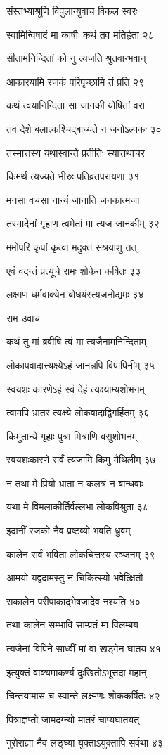 संस्तभ्याश्रूणि विपुलान्युवाच विकल स्वरः

स्वामिन्विषादं मा कार्षीः कथं तव मतिर्हृता २८

सीतामनिन्दितां को नु त्यजति श्रुतवान्भवान्

आकारयामि रजकं परिपृच्छामि तं प्रति २९

कथं त्वयानिन्दिता सा जानकी योषितां वरा

तव देशे बलात्कश्चिद्बाध्यते न जनोऽल्पकः ३०

तस्मात्तस्य यथास्वान्ते प्रतीतिः स्यात्तथाचर

किमर्थं त्यज्यते भीरुः पतिव्रतपरायणा ३१

मनसा वचसा नान्यं जानाति जनकात्मजा

तस्मादेनां गृहाण त्वमेतां मा त्यज जानकीम् ३२

ममोपरि कृपां कृत्वा मदुक्तं संश्रयाशु तत्

एवं वदन्तं प्रत्यूचे रामः शोकेन कर्षितः ३३

लक्ष्मणं धर्मवाक्येन बोधयंस्त्यजनोद्यमः ३४

राम उवाच

कथं तु मां ब्रवीषि त्वं मा त्यजैनामनिन्दिताम्

लोकापवादात्त्यक्ष्येऽहं जानन्नपि विपापिनीम् ३५

स्वयशः कारणेऽहं स्वं देहं त्यक्ष्याम्यशोभनम्

त्वामपि भ्रातरं त्यक्ष्ये लोकवादाद्विगर्हितम् ३६

किमुतान्ये गृहाः पुत्रा मित्राणि वसुशोभनम्

स्वयशःकारणे सर्वं त्यजामि किमु मैथिलीम् ३७

न तथा मे प्रियो भ्राता न कलत्रं न बान्धवाः

यथा मे विमलाकीर्तिर्वल्लभा लोकविश्रुता ३८

इदानीं रजको नैव प्रष्टव्यो भवति ध्रुवम्

कालेन सर्वं भविता लोकचित्तस्य रञ्जनम् ३९

आमयो यद्वदामस्तु न चिकित्स्यो भवेत्क्षितौ

सकालेन परीपाकाद्भेषजादेव नश्यति ४०

तथा कालेन सम्भावि साम्प्रतं मा विलम्बय

त्यजैनां विपिने साध्वीं मां वा खड्गेन घातय ४१

इत्युक्तं वाक्यमाकर्ण्य दुःखितोऽभूत्तदा महान्

चिन्तयामास च स्वान्ते लक्ष्मणः शोककर्षितः ४२

पित्राज्ञप्तो जामदग्न्यो मातरं चाप्यघातयत्

गुरोराज्ञा नैव लङ्घ्या युक्ताऽयुक्तापि सर्वथा ४३

